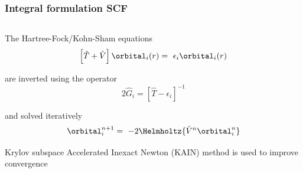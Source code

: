 \begin{frame}
    \frametitle{Integral formulation SCF}
    \begin{columns}
    \begin{column}[b]{0.45\textwidth}

    \centering
    The Hartree-Fock/Kohn-Sham equations
    \begin{equation}
        \nonumber
        \left[\hat{T} + \hat{V}\right]\orbital_i(r) =\ \epsilon_i \orbital_i(r)
    \end{equation}

    \vspace{5mm}
    are inverted using the operator
    \begin{equation}
        \nonumber
        2\hat{G}_i = \left[\hat{T} - \epsilon_i\right]^{-1}
    \end{equation}

    \vspace{5mm}
    and solved iteratively
    \begin{equation}
        \nonumber
        \orbital_i^{n+1} =\ -2\Helmholtz{\hat{V}^n\orbital_i^n}
    \end{equation}

    \vspace{5mm}
    Krylov subspace Accelerated Inexact Newton (KAIN) 
    method is used to improve convergence
    \vspace{10mm}
    \end{column}


\end{columns}
\end{frame}
